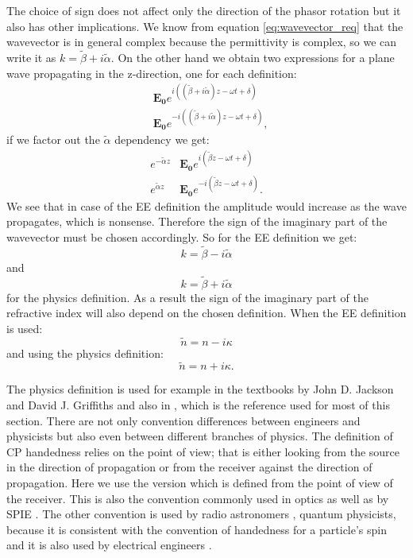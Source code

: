 The choice of sign does not affect only the direction of the phasor rotation but it also has other implications. We know from equation \ref{eq:wavevector_req} that the wavevector is in general complex because the permittivity is complex, so we can write it as $k=\tilde{\beta} + i \tilde{\alpha}$. On the other hand we obtain two expressions for a plane wave propagating in the z-direction, one for each definition:
\begin{align}
    &\bm{E_{0}}e^{i((\tilde{\beta} + i \tilde{\alpha})z-\omega t + \delta)} \\
    &\bm{E_{0}}e^{-i((\tilde{\beta} + i \tilde{\alpha})z-\omega t + \delta)}, 
\end{align}
if we factor out the $\tilde{\alpha}$ dependency we get:
\begin{align}
    e^{-\tilde{\alpha} z}&\bm{E_{0}}e^{i(\tilde{\beta} z-\omega t + \delta)} \\
    e^{\tilde{\alpha} z}&\bm{E_{0}}e^{-i(\tilde{\beta} z-\omega t + \delta)}. 
\end{align}
We see that in case of the EE definition the amplitude would increase as the wave propagates, which is nonsense. Therefore the sign of the imaginary part of the wavevector must be chosen accordingly. So for the EE definition we get:
\begin{equation}
    k=\tilde{\beta} - i \tilde{\alpha}
\end{equation}
and 
\begin{equation}
    k=\tilde{\beta} + i \tilde{\alpha}
\end{equation}
for the physics definition.
As a result the sign of the imaginary part of the refractive index will also depend on the chosen definition. When the EE definition is used:
\begin{equation}
    \tilde{n}= n - i \kappa
\end{equation}
and using the physics definition:  
\begin{equation}
    \tilde{n}= n + i \kappa.
\end{equation}

The physics definition is used for example in the textbooks by John D. Jackson \cite{Jackson1998} and David J. Griffiths \cite{Griffiths2017} and also in \cite{Collett2009}, which is the reference used for most of this section.
There are not only convention differences between engineers and physicists but also even between different branches of physics. The definition of CP handedness relies on the point of view; that is either looking from the source in the direction of propagation or from the receiver against the direction of propagation. Here we use the version which is defined from the point of view of the receiver. This is also the convention commonly used in optics \cite{Bass1995, M.LandiDeglInnocenti2004} as well as by SPIE \cite{Collett2009}.
The other convention is used by radio astronomers \cite{Born1999}, quantum physicists, because it is consistent with the convention of handedness for a particle's spin and it is also used by electrical engineers \cite{Orfanidis2004}.

